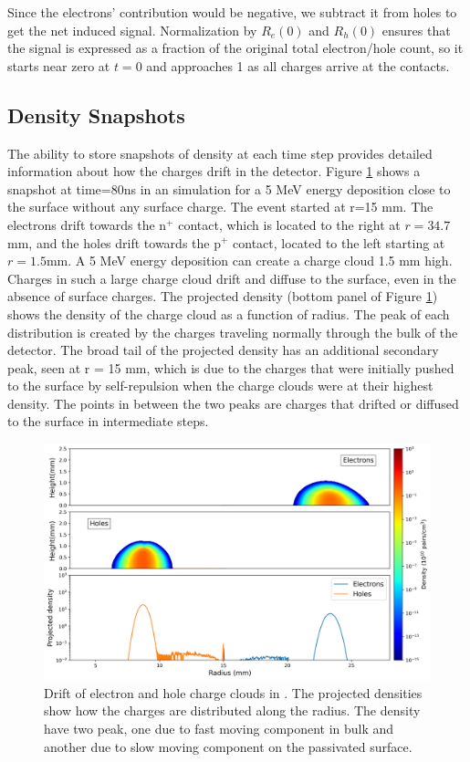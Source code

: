 \noindent
Since the electrons’ contribution would be negative, we subtract it from holes to get the net induced signal. Normalization by $R_{e}(0)$ and $R_{h}(0)$ ensures that the signal is expressed as a fraction of the original total electron/hole count, so it starts near zero at $t=0$ and approaches 1 as all charges arrive at the contacts.

\subsection{Density Snapshots}

The ability to store snapshots of density at each time step provides detailed information about how the charges drift in the detector. Figure \ref{ch3_fig_ehd_path_pd_sc_0} shows a snapshot at time=$80$ns in an {\ehd} simulation for a 5 MeV energy deposition close to the surface without any surface charge. The event started at r=15 mm. The electrons drift towards the n$^+$ contact, which is located to the right at $r=34.7$mm, and the holes drift towards the p$^+$ contact, located to the left starting at $r=1.5$mm. A 5 MeV energy deposition can create a charge cloud 1.5 mm high. Charges in such a large charge cloud drift and diffuse to the surface, even in the absence of surface charges. The projected density (bottom panel of Figure \ref{ch3_fig_ehd_path_pd_sc_0}) shows the density of the charge cloud as a function of radius. The peak of each distribution is created by the charges traveling normally through the bulk of the detector. The broad tail of the projected density has an additional secondary peak, seen at r = 15 mm, which is due to the charges that were initially pushed to the surface by self-repulsion when the charge clouds were at their highest density. The points in between the two peaks are charges that drifted or diffused to the surface in intermediate steps. 

\begin{figure}%
    \includegraphics[trim={0cm 0 0cm 0},clip,width=0.99\linewidth]{ch3/figs/drift_path_sc=0.0.png}
    \caption{Drift of electron and hole charge clouds in {\ehd}. The projected densities show how the charges are distributed along the radius. The density have two peak, one due to fast moving component in bulk and another due to slow moving component on the passivated surface.}
    \label{ch3_fig_ehd_path_pd_sc_0}
\end{figure}

